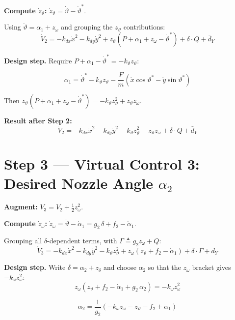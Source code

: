 \documentclass[11pt,a4paper]{article}
\theoremstyle{plain}
\theoremstyle{remark}
\newcommand{\vth}{\vartheta}
\newcommand{\vths}{\vartheta^*}
\newcommand{\zth}{z_{\vth}}
\newcommand{\zom}{z_{\omega}}
\newcommand{\zdel}{z_{\delta}}
\begin{document}
\textbf{Compute $\dot\zth$:} $\dot\zth = \dot\vth - \dot\vths$.

Using $\dot\vth = \alpha_1 + \zom$ and grouping the $\zth$ contributions:
\[
  \dot V_2 = -k_{dx}\dot x^2 - k_{dy}\dot y^2 + \zth(P + \alpha_1 + \zom - \dot\vths) + \delta\cdot Q + \bar{d}_Y
\]

\textbf{Design step.} Require $P + \alpha_1 - \dot\vths = -k_\vth \zth$:

\begin{equation}
  \boxed{\alpha_1 = \dot\vths - k_\vth \zth - \frac{F}{m}(\dot x\cos\vths - \dot y\sin\vths)}
  \tag{VC1}
\end{equation}

Then $\zth(P + \alpha_1 + \zom - \dot\vths) = -k_\vth \zth^2 + \zth\zom$.

\textbf{Result after Step 2:}
\begin{equation}
  \dot V_2 = -k_{dx}\dot x^2 - k_{dy}\dot y^2 - k_\vth \zth^2 + \zth\zom + \delta\cdot Q + \bar{d}_Y
  \tag{DV2}
\end{equation}

\section{Step 3 --- Virtual Control 3: Desired Nozzle Angle \texorpdfstring{$\alpha_2$}{alpha2}}

\textbf{Augment:} $V_3 = V_2 + \tfrac{1}{2}\zom^2$.

\textbf{Compute $\dot\zom$:} $\dot\zom = \ddot\vth - \dot\alpha_1 = g_2\,\delta + f_2 - \dot\alpha_1$.

Grouping all $\delta$-dependent terms, with $\Gamma \triangleq g_2\zom + Q$:
\begin{equation}
  \dot V_3 = -k_{dx}\dot x^2 - k_{dy}\dot y^2 - k_\vth \zth^2 + \zom(\zth + f_2 - \dot\alpha_1) + \delta\cdot\Gamma + \bar{d}_Y
  \tag{DV3}
\end{equation}

\textbf{Design step.} Write $\delta = \alpha_2 + \zdel$ and choose $\alpha_2$ so that the $\zom$ bracket gives $-k_\omega\zom^2$:
\[
  \zom(\zth + f_2 - \dot\alpha_1 + g_2\,\alpha_2) = -k_\omega\zom^2
\]

\begin{equation}
  \boxed{\alpha_2 = \frac{1}{g_2}\!\left(-k_\omega \zom - \zth - f_2 + \dot\alpha_1\right)}
  \tag{VC2}
\end{equation}
\end{document}

